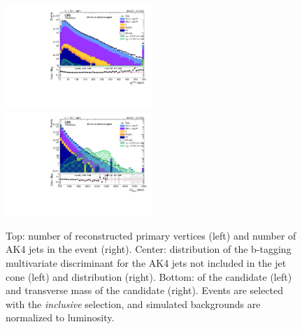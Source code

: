 \begin{figure}[!htb]
\begin{center}
    \includegraphics[width=0.495\textwidth]{plots/v9_U/XVZnnInc/X_pt.pdf}
    \includegraphics[width=0.495\textwidth]{plots/v9_U/XVZnnInc/X_tmass.pdf}

    \caption{Top: number of reconstructed primary vertices (left) and number of AK4 jets in the event (right). Center: distribution of the b-tagging multivariate discriminant for the AK4 jets not included in the \V jet cone (left) and \MET distribution (right). Bottom: \pt of the \VZ candidate (left) and transverse mass of the \VZ candidate (right). Events are selected with the \emph{inclusive} selection, and simulated backgrounds are normalized to luminosity.}
  \end{center}
\end{figure}

\clearpage


